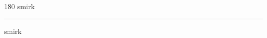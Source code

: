 
\begin{frame}
\begin{center}
\begin{turn}{180}
{\fontsize{2.5cm}{1em}\selectfont smirk}
\end{turn}
\vspace{1em}\par  
\hrule
\vspace{1em}\par  
{\fontsize{2.5cm}{1em}\selectfont smirk}
\end{center}
\end{frame}
